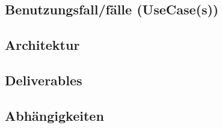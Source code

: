\documentclass[../Pflichtenheft.tex]{subfiles}
\begin{document}
    \subsection{Benutzungsfall/fälle (UseCase(s)) }

    \subsection{Architektur}
    \subsection{Deliverables}
    \subsection{Abhängigkeiten}
\end{document}
